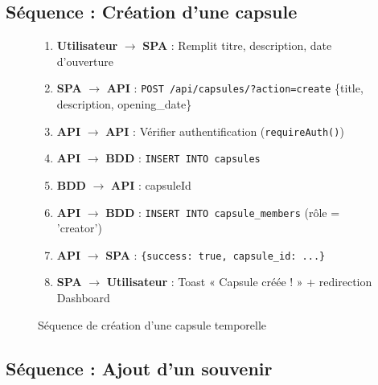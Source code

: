\documentclass[12pt,a4paper]{report}
\begin{document}
\subsection{Séquence : Création d'une capsule}

\begin{figure}[H]
    \centering
    \begin{tcolorbox}[colback=codebg, colframe=codeframe, width=\textwidth, title={\textbf{Diagramme de séquence — Création d'une capsule}}]
        \small
        \begin{enumerate}[noitemsep]
            \item \textbf{Utilisateur} $\rightarrow$ \textbf{SPA} : Remplit titre, description, date d'ouverture
            \item \textbf{SPA} $\rightarrow$ \textbf{API} : \texttt{POST /api/capsules/?action=create} \{title, description, opening\_date\}
            \item \textbf{API} $\rightarrow$ \textbf{API} : Vérifier authentification (\texttt{requireAuth()})
            \item \textbf{API} $\rightarrow$ \textbf{BDD} : \texttt{INSERT INTO capsules}
            \item \textbf{BDD} $\rightarrow$ \textbf{API} : capsuleId
            \item \textbf{API} $\rightarrow$ \textbf{BDD} : \texttt{INSERT INTO capsule\_members} (rôle = 'creator')
            \item \textbf{API} $\rightarrow$ \textbf{SPA} : \texttt{\{success: true, capsule\_id: ...\}}
            \item \textbf{SPA} $\rightarrow$ \textbf{Utilisateur} : Toast « Capsule créée ! » + redirection Dashboard
        \end{enumerate}
    \end{tcolorbox}
    \caption{Séquence de création d'une capsule temporelle}
\end{figure}


\subsection{Séquence : Ajout d'un souvenir}
\end{document}

